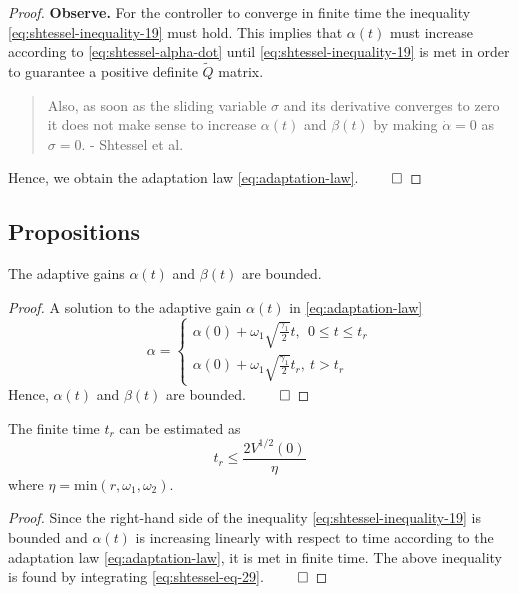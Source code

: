 \begin{proof}
        \textbf{Observe.}
        For the controller to converge in finite time the inequality \eqref{eq:shtessel-inequality-19} must hold. This implies that $\alpha(t)$ must increase according to \eqref{eq:shtessel-alpha-dot} until \eqref{eq:shtessel-inequality-19} is met in order to guarantee a positive definite $\tilde{Q}$ matrix.

        \begin{quote}
          Also, as soon as the sliding variable $\sigma$ and its derivative converges to zero it does not make sense to increase $\alpha(t)$ and $\beta(t)$ by making $\dot{\alpha} = 0$ as $\sigma = 0$. - Shtessel et al. \cite{Sht:10}
        \end{quote}
        Hence, we obtain the adaptation law \eqref{eq:adaptation-law}. $\qed$
\end{proof}

\subsection{Propositions}
\begin{proposition}
    The adaptive gains $\alpha(t)$ and $\beta(t)$ are bounded.
\end{proposition}
\begin{proof}
    A solution to the adaptive gain $\alpha(t)$ in \eqref{eq:adaptation-law}
    \begin{equation}
    \alpha =
    \begin{cases}
        \alpha(0) + \omega_1\sqrt{\frac{\gamma_1}{2}}t, \ \ 0 \leq t \leq t_r \\
        \alpha(0) + \omega_1\sqrt{\frac{\gamma_1}{2}}t_r, \ t > t_r
    \end{cases}
    \end{equation}
    Hence, $\alpha(t)$ and $\beta(t)$ are bounded. $\qed$
\end{proof}

\begin{proposition}
    The finite time $t_r$ can be estimated as
\begin{equation}
    t_r \leq \frac{2V^{1/2}(0)}{\eta}
\end{equation}
where $\eta = \text{min}(r, \omega_1, \omega_2)$.
\end{proposition}
\begin{proof}
    Since the right-hand side of the inequality \eqref{eq:shtessel-inequality-19} is bounded and $\alpha(t)$ is increasing linearly with respect to time according to the adaptation law \eqref{eq:adaptation-law}, it is met in finite time.
      The above inequality is found by integrating \eqref{eq:shtessel-eq-29}.
      $\qed$
\end{proof}

